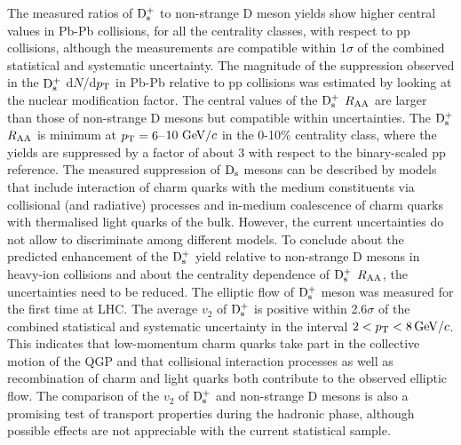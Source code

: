 The measured ratios of ${\rm D_s^+}$ to non-strange D meson yields show higher central values in Pb-Pb collisions,
for all the centrality classes, with respect to pp collisions, although the measurements are compatible
within 1$\sigma$ of the combined statistical and systematic uncertainty.
The magnitude of the suppression observed in the ${\rm D_s^+}$ d$N$/d$p_{\rm T}$ in Pb-Pb  
relative to pp collisions was estimated by looking at the nuclear modification factor.
The central values of the ${\rm D_s^+}$ $R_{\rm AA}$ are larger than those of 
non-strange D mesons but compatible within uncertainties. The ${\rm D_s^+}$ $R_{\rm AA}$ is minimum
at $p_{\rm T}=6$--$10~\mathrm{GeV}/c$ in the 0-10\% centrality class, 
where the yields are suppressed by a factor of about 3 with respect to the binary-scaled pp reference.
The measured suppression of ${\rm D_s}$ mesons
can be described by models that include interaction of charm quarks with the medium constituents
via collisional (and radiative) processes and in-medium coalescence of charm quarks
with thermalised light quarks of the bulk. However, the current uncertainties do not allow
to discriminate among different models. To conclude about the 
predicted enhancement of the ${\rm D_s^+}$ yield relative to non-strange D mesons in 
heavy-ion collisions and about the centrality dependence of ${\rm D_s^+}$ $R_{\rm AA}$, the 
uncertainties need to be reduced.
The elliptic flow of ${\rm D_s^+}$ meson was measured for the first time at LHC. The
 average $v_2$ of ${\rm D_s^+}$ is positive within 2.6$\sigma$ of the combined statistical and systematic 
 uncertainty in the interval $2 < p_{\rm T} <8 \, \mathrm{GeV}/c$. This indicates that low-momentum charm quarks take part in the
collective motion of the QGP and that collisional interaction processes as well as recombination of charm
and light quarks both contribute to the observed elliptic flow. The comparison of the $v_2$ of ${\rm D_s^+}$ and
 non-strange D mesons is also a promising test of transport properties during the hadronic phase,
 although possible effects are not appreciable with the current statistical sample.\\
 
